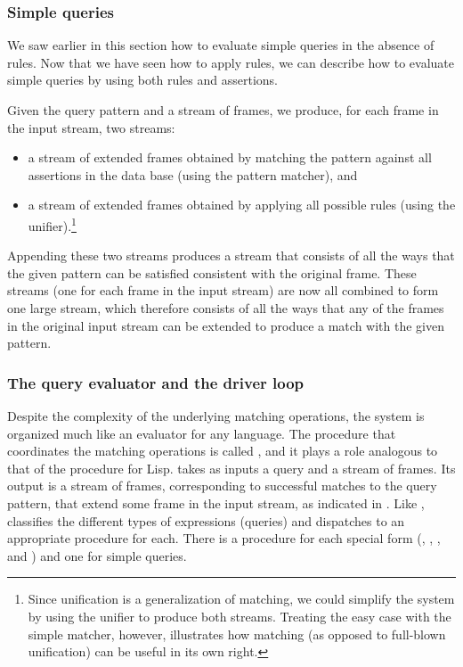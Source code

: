 \subsubsection*{Simple queries}

We saw earlier in this section how to evaluate simple queries in the absence of
rules.  Now that we have seen how to apply rules, we can describe how to
evaluate simple queries by using both rules and assertions.

Given the query pattern and a stream of frames, we produce, for each frame in
the input stream, two streams:

\begin{itemize}

\item
a stream of extended frames obtained by matching the pattern against all
assertions in the data base (using the pattern matcher), and

\item
a stream of extended frames obtained by applying all possible rules (using the
unifier).\footnote{Since unification is a generalization of matching, we could
simplify the system by using the unifier to produce both streams.  Treating the
easy case with the simple matcher, however, illustrates how matching (as
opposed to full-blown unification) can be useful in its own right.}

\end{itemize}

\noindent
Appending these two streams produces a stream that consists of all the ways
that the given pattern can be satisfied consistent with the original frame.
These streams (one for each frame in the input stream) are now all combined to
form one large stream, which therefore consists of all the ways that any of the
frames in the original input stream can be extended to produce a match with the
given pattern.

\subsubsection*{The query evaluator and the driver loop}

Despite the complexity of the underlying matching operations, the system is
organized much like an evaluator for any language.  The procedure that
coordinates the matching operations is called , and it plays a role
analogous to that of the  procedure for Lisp.   takes as
inputs a query and a stream of frames.  Its output is a stream of frames,
corresponding to successful matches to the query pattern, that extend some
frame in the input stream, as indicated in .  Like ,
 classifies the different types of expressions (queries) and
dispatches to an appropriate procedure for each.  There is a procedure for each
special form (, , , and ) and one
for simple queries.

